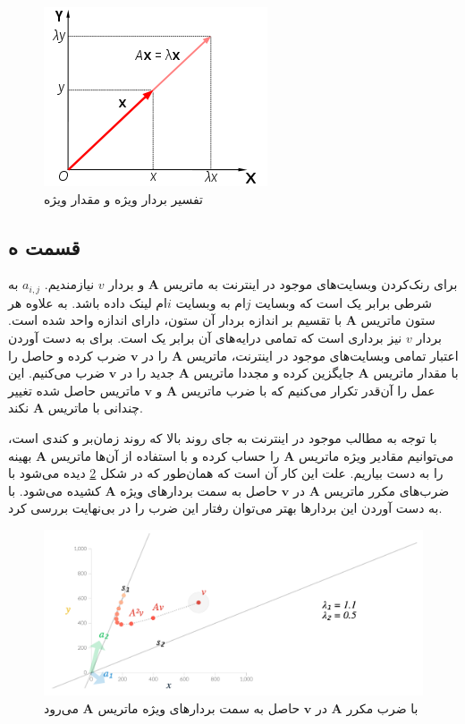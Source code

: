 \documentclass[14pt,a4]{article}
\begin{document}
\begin{figure}[h]
    \centering
    \includegraphics[scale=0.4]{images/q7/250px-Eigenvalue_equation.svg.png}
    \caption{تفسیر بردار ویژه و مقدار ویژه}
    \label{eigenvalue-and-eigenvector-interpretation}
\end{figure}

\subsection*{قسمت ه}

برای رنک‌کردن وبسایت‌های موجود در اینترنت به ماتریس $\textbf{A}$ و بردار $v$ نیازمندیم.  $a_{i,j}$ به شرطی
برابر یک است که وبسایت $j$ام به وبسایت $i$ام لینک داده باشد. به علاوه هر ستون ماتریس $\textbf{A}$
با تقسیم بر اندازه بردار آن ستون، دارای اندازه واحد شده است. بردار $v$ نیز برداری است که تمامی درایه‌های
آن برابر یک است. برای به دست آوردن اعتبار تمامی وبسایت‌های موجود در اینترنت،
ماتریس $\textbf{A}$ را در $\textbf{v}$ ضرب کرده و حاصل را با مقدار ماتریس $\textbf{A}$ جایگزین کرده
و مجددا ماتریس $\textbf{A}$ جدید را در $\textbf{v}$ ضرب می‌کنیم. این عمل را آن‌قدر تکرار می‌کنیم که
با ضرب ماتریس $\textbf{A}$ و $\textbf{v}$ ماتریس حاصل شده تغییر چندانی با ماتریس $\textbf{A}$
نکند.

با توجه به مطالب موجود در اینترنت
به جای روند بالا که روند زمان‌بر و کندی است، می‌توانیم مقادیر ویژه ماتریس $\textbf{A}$ را حساب کرده و
با استفاده از آن‌ها ماتریس $\textbf{A}$ بهینه را به دست بیاریم. علت این کار آن است که همان‌طور که در شکل
\ref{eigen-process} دیده می‌شود با ضرب‌های  مکرر ماتریس $\textbf{A}$ در $\textbf{v}$ حاصل به سمت بردار‌های ویژه $\textbf{A}$
کشیده می‌شود. با به دست آوردن این بردار‌ها بهتر می‌توان رفتار این ضرب را در بی‌نهایت بررسی کرد.

\begin{figure}[h]
    \centering
    \includegraphics[scale=0.4]{images/q7/eigen_process.png}
    \caption{با ضرب مکرر $\textbf{A}$ در $\textbf{v}$ حاصل به سمت بردار‌های ویژه ماتریس $\textbf{A}$ می‌رود}
    \label{eigen-process}
\end{figure}
\end{document}

